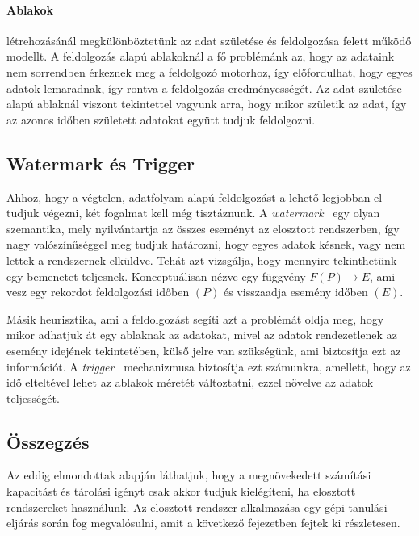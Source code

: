 \documentclass[a4paper,12pt]{article}
\begin{document}
\paragraph{Ablakok}\hspace*{-0.4cm} létrehozásánál megkülönböztetünk az adat születése és feldolgozása felett működő modellt. A feldolgozás alapú ablakoknál a fő problémánk az, hogy az adataink nem sorrendben érkeznek meg a feldolgozó motorhoz, így előfordulhat, hogy egyes adatok lemaradnak, így rontva a feldolgozás eredményességét. Az adat születése alapú ablaknál viszont tekintettel vagyunk arra, hogy mikor születik az adat, így az azonos időben született adatokat együtt tudjuk feldolgozni.

\subsection{Watermark és Trigger}

Ahhoz, hogy a végtelen, adatfolyam alapú feldolgozást a lehető legjobban el tudjuk végezni, két fogalmat kell még tisztáznunk. A \textit{watermark}~\cite{millwheel} egy olyan szemantika, mely nyilvántartja az összes eseményt az elosztott rendszerben, így nagy valószínűséggel meg tudjuk határozni, hogy egyes adatok késnek, vagy nem lettek a rendszernek elküldve. Tehát azt vizsgálja, hogy mennyire tekinthetünk egy bemenetet teljesnek. Konceptuálisan nézve egy függvény     $F(P) \rightarrow E$, ami vesz egy rekordot feldolgozási időben $(P)$ és visszaadja esemény időben $(E)$. \newline

Másik heurisztika, ami a feldolgozást segíti azt a problémát oldja meg, hogy mikor adhatjuk át egy ablaknak az adatokat, mivel az adatok rendezetlenek az esemény idejének tekintetében, külső jelre van szükségünk, ami biztosítja ezt az információt. A \textit{trigger}~\cite{skew} mechanizmusa biztosítja ezt számunkra, amellett, hogy az idő elteltével lehet az ablakok méretét változtatni, ezzel növelve az adatok teljességét. 
	
\subsection{Összegzés}
Az eddig elmondottak alapján láthatjuk, hogy a megnövekedett számítási kapacitást és tárolási igényt csak akkor tudjuk kielégíteni, ha elosztott rendszereket használunk. Az elosztott rendszer alkalmazása egy gépi tanulási eljárás során fog megvalósulni, amit a következő fejezetben fejtek ki részletesen.
\end{document}
